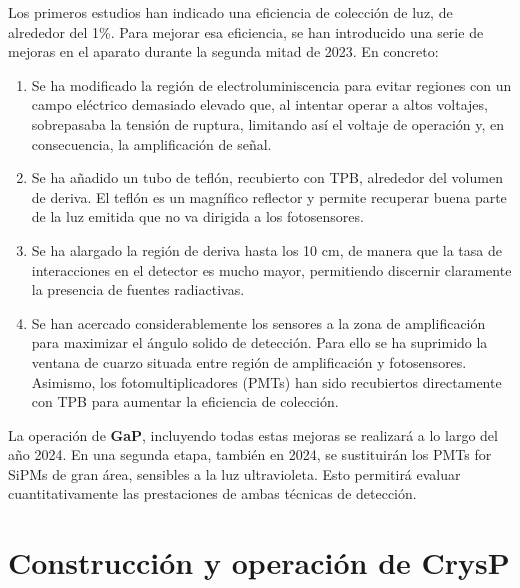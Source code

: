 \documentclass[12pt,a4paper,article]{report} %
\def\gap{{\bf GaP}}
\def\crysp{{\bf CrysP}}
\begin{document}
Los primeros estudios han indicado una eficiencia de colección de luz, de alrededor del 1\%. Para mejorar esa eficiencia, se han introducido una serie de mejoras en el aparato durante la segunda mitad de 2023. En concreto:
\begin{enumerate}
\item Se ha modificado la región de electroluminiscencia para evitar regiones con un campo eléctrico demasiado elevado que, al intentar operar a altos voltajes, sobrepasaba la tensión de ruptura, limitando así el voltaje de operación y, en consecuencia, la amplificación de señal.
\item Se ha añadido un tubo de teflón, recubierto con TPB, alrededor del volumen de deriva. El teflón es un magnífico reflector y permite recuperar buena parte de la luz emitida que no va dirigida a los fotosensores.
\item Se ha alargado la región de deriva hasta los 10 cm, de manera que la tasa de interacciones en el detector es mucho mayor, permitiendo discernir claramente la presencia de fuentes radiactivas.
\item Se han acercado considerablemente los sensores a la zona de amplificación para maximizar el ángulo solido de detección. Para ello se ha suprimido la ventana de cuarzo situada entre región de amplificación y fotosensores. Asimismo, los fotomultiplicadores (PMTs) han sido recubiertos directamente con TPB para aumentar la eficiencia de colección.
\end{enumerate}

La operación de \gap, incluyendo todas estas mejoras se realizará a lo largo 
del año 2024. En una segunda etapa, también en 2024, se sustituirán los PMTs for SiPMs de gran área, sensibles a la luz ultravioleta. Esto permitirá evaluar cuantitativamente las prestaciones de ambas técnicas de detección. 

\section*{Construcción y operación de \crysp}
\end{document}
